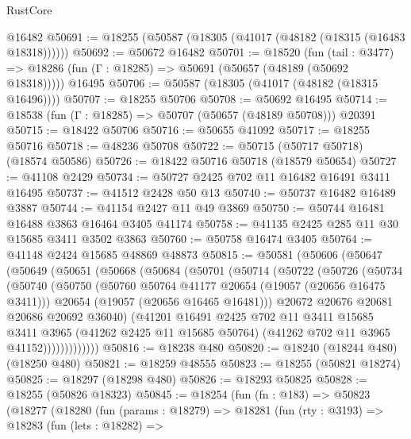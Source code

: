 \begin{lexlean}{RustCore}
\begin{coremodule}
    @16482
@50691 := @18255 (@50587 (@18305 (@41017 (@48182 (@18315 (@16483 @18318))))))
@50692 := @50672 @16482
@50701 := @18520
    (fun (tail : @3477) => @18286 (fun (Γ : @18285) => @50691 (@50657 (@48189 (@50692 @18318)))))
    @16495
@50706 := @50587 (@18305 (@41017 (@48182 (@18315 @16496))))
@50707 := @18255 @50706
@50708 := @50692 @16495
@50714 := @18538 (fun (Γ : @18285) => @50707 (@50657 (@48189 @50708))) @20391
@50715 := @18422 @50706
@50716 := @50655 @41092
@50717 := @18255 @50716
@50718 := @48236 @50708
@50722 := @50715 (@50717 @50718) (@18574 @50586)
@50726 := @18422 @50716 @50718 (@18579 @50654)
@50727 := @41108 @2429
@50734 := @50727 @2425 @702 @11 @16482 @16491 @3411 @16495
@50737 := @41512 @2428 @50 @13
@50740 := @50737 @16482 @16489 @3887
@50744 := @41154 @2427 @11 @49 @3869
@50750 := @50744 @16481 @16488 @3863 @16464 @3405 @41174
@50758 := @41135 @2425 @285 @11 @30 @15685 @3411 @3502 @3863
@50760 := @50758 @16474 @3405
@50764 := @41148 @2424 @15685 @48869 @48873
@50815 := @50581
    (@50606
      (@50647
        (@50649
          (@50651
            (@50668
              (@50684
                (@50701
                  (@50714
                    (@50722
                      (@50726
                        (@50734
                          (@50740
                            (@50750
                              (@50760 @50764 @41177 @20654 (@19057 (@20656 @16475 @3411)))
                              @20654
                              (@19057 (@20656 @16465 @16481)))
                            @20672
                            @20676
                            @20681
                            @20686
                            @20692
                            @36040)
                          (@41201
                            @16491
                            @2425
                            @702
                            @11
                            @3411
                            @15685
                            @3411
                            @3965
                            (@41262 @2425 @11 @15685 @50764)
                            (@41262 @702 @11 @3965 @41152)))))))))))))
@50816 := @18238 @480
@50820 := @18240 (@18244 @480) (@18250 @480)
@50821 := @18259 @48555
@50823 := @18255 (@50821 @18274)
@50825 := @18297 (@18298 @480)
@50826 := @18293 @50825
@50828 := @18255 (@50826 @18323)
@50845 := @18254
    (fun (fn : @183) =>
    @50823
      (@18277
        (@18280
          (fun (params : @18279) =>
          @18281
            (fun (rty : @3193) =>
            @18283
              (fun (lets : @18282) =>

\end{coremodule}
\end{lexlean}

